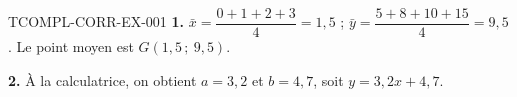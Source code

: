 \begin{corrige}{TCOMPL-CORR-EX-001}
\textbf{1.} $\bar{x} = \dfrac{0+1+2+3}{4} = 1{,}5$ ; $\bar{y} = \dfrac{5+8+10+15}{4} = 9{,}5$. Le point moyen est $G(1{,}5\,;\ 9{,}5)$.

\textbf{2.} À la calculatrice, on obtient $a=3{,}2$ et $b=4{,}7$, soit $y=3{,}2x+4{,}7$.
\end{corrige}
